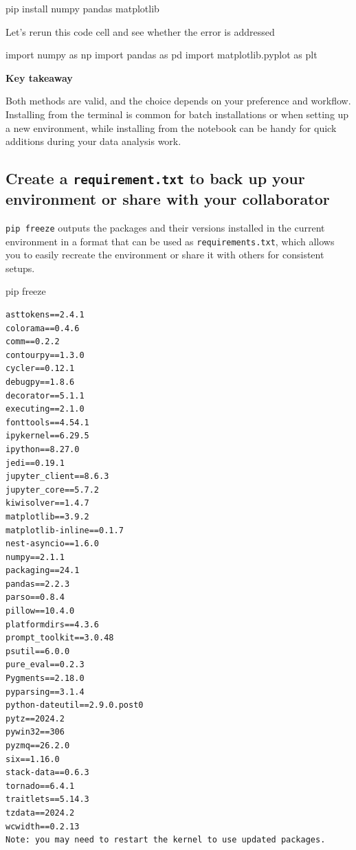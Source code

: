 \documentclass[
  letterpaper,
  DIV=11,
  numbers=noendperiod]{scrreprt}
\newenvironment{Shaded}{\begin{snugshade}}{\end{snugshade}}
\newcommand{\ImportTok}[1]{\textcolor[rgb]{0.00,0.46,0.62}{#1}}
\newcommand{\NormalTok}[1]{\textcolor[rgb]{0.00,0.23,0.31}{#1}}
\begin{document}
\begin{Shaded}
\begin{Highlighting}[]
\NormalTok{pip install numpy pandas matplotlib}
\end{Highlighting}
\end{Shaded}

Let's rerun this code cell and see whether the error is addressed

\begin{Shaded}
\begin{Highlighting}[]
\ImportTok{import}\NormalTok{ numpy }\ImportTok{as}\NormalTok{ np}
\ImportTok{import}\NormalTok{ pandas }\ImportTok{as}\NormalTok{ pd}
\ImportTok{import}\NormalTok{ matplotlib.pyplot }\ImportTok{as}\NormalTok{ plt}
\end{Highlighting}
\end{Shaded}

\textbf{Key takeaway}

Both methods are valid, and the choice depends on your preference and
workflow. Installing from the terminal is common for batch installations
or when setting up a new environment, while installing from the notebook
can be handy for quick additions during your data analysis work.

\hypertarget{create-a-requirement.txt-to-back-up-your-environment-or-share-with-your-collaborator}{%
\subsection{\texorpdfstring{Create a \texttt{requirement.txt} to back up
your environment or share with your
collaborator}{Create a requirement.txt to back up your environment or share with your collaborator}}\label{create-a-requirement.txt-to-back-up-your-environment-or-share-with-your-collaborator}}

\texttt{pip\ freeze} outputs the packages and their versions installed
in the current environment in a format that can be used as
\texttt{requirements.txt}, which allows you to easily recreate the
environment or share it with others for consistent setups.

\begin{Shaded}
\begin{Highlighting}[]
\NormalTok{pip freeze}
\end{Highlighting}
\end{Shaded}

\begin{verbatim}
asttokens==2.4.1
colorama==0.4.6
comm==0.2.2
contourpy==1.3.0
cycler==0.12.1
debugpy==1.8.6
decorator==5.1.1
executing==2.1.0
fonttools==4.54.1
ipykernel==6.29.5
ipython==8.27.0
jedi==0.19.1
jupyter_client==8.6.3
jupyter_core==5.7.2
kiwisolver==1.4.7
matplotlib==3.9.2
matplotlib-inline==0.1.7
nest-asyncio==1.6.0
numpy==2.1.1
packaging==24.1
pandas==2.2.3
parso==0.8.4
pillow==10.4.0
platformdirs==4.3.6
prompt_toolkit==3.0.48
psutil==6.0.0
pure_eval==0.2.3
Pygments==2.18.0
pyparsing==3.1.4
python-dateutil==2.9.0.post0
pytz==2024.2
pywin32==306
pyzmq==26.2.0
six==1.16.0
stack-data==0.6.3
tornado==6.4.1
traitlets==5.14.3
tzdata==2024.2
wcwidth==0.2.13
Note: you may need to restart the kernel to use updated packages.
\end{verbatim}
\end{document}
